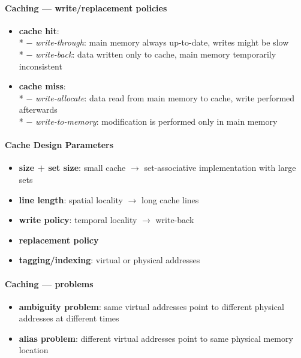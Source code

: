\paragraph{Caching --- write/replacement policies}
\begin{itemize}
  \item \textbf{cache hit}: \\*
    $ - $ \emph{write-through}: main memory always up-to-date, writes might be slow \\*
    $ - $ \emph{write-back}: data written only to cache, main memory temporarily inconsistent
  \item \textbf{cache miss}: \\*
    $ - $ \emph{write-allocate}: data read from main memory to cache, write performed afterwards \\*
    $ - $ \emph{write-to-memory}: modification is performed only in main memory
\end{itemize}

\paragraph{Cache Design Parameters}
\begin{itemize}
  \item \textbf{size + set size}: small cache $ \to $ set-associative implementation with large sets
  \item \textbf{line length}: spatial locality $ \to $ long cache lines
  \item \textbf{write policy}: temporal locality $ \to $ write-back
  \item \textbf{replacement policy}
  \item \textbf{tagging/indexing}: virtual or physical addresses
\end{itemize}

\paragraph{Caching --- problems}
\begin{itemize}
  \item \textbf{ambiguity problem}: same virtual addresses point to different physical addresses at different times
  \item \textbf{alias problem}: different virtual addresses point to same physical memory location
\end{itemize}

